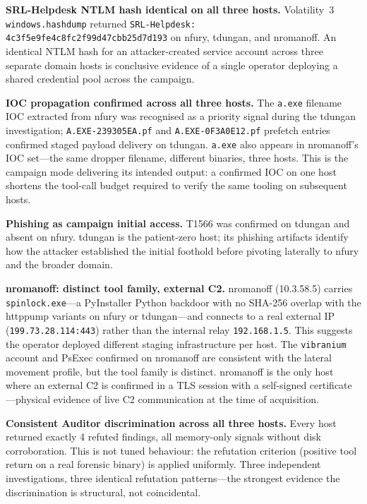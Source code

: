 \documentclass[sigconf, nonacm]{acmart}
\begin{document}
\textbf{SRL-Helpdesk NTLM hash identical on all three hosts.}
Volatility~3 \texttt{windows.hashdump} returned
\texttt{SRL-Helpdesk: 4c3f5e9fe4c8fc2f99d47cbb25d7d193}
on nfury, tdungan, and nromanoff. An identical NTLM hash for an
attacker-created service account across three separate domain hosts
is conclusive evidence of a single operator deploying a shared
credential pool across the campaign.

\textbf{IOC propagation confirmed across all three hosts.}
The \texttt{a.exe} filename IOC extracted from nfury was recognised
as a priority signal during the tdungan investigation;
\texttt{A.EXE-239305EA.pf} and \texttt{A.EXE-0F3A0E12.pf} prefetch
entries confirmed staged payload delivery on tdungan.
\texttt{a.exe} also appears in nromanoff's IOC set---the same dropper
filename, different binaries, three hosts. This is the campaign mode
delivering its intended output: a confirmed IOC on one host shortens
the tool-call budget required to verify the same tooling on subsequent
hosts.

\textbf{Phishing as campaign initial access.} T1566 was confirmed
on tdungan and absent on nfury. tdungan is the patient-zero host;
its phishing artifacts identify how the attacker established the
initial foothold before pivoting laterally to nfury and the broader
domain.

\textbf{nromanoff: distinct tool family, external C2.}
nromanoff (10.3.58.5) carries \texttt{spinlock.exe}---a PyInstaller
Python backdoor with no SHA-256 overlap with the httppump variants on
nfury or tdungan---and connects to a real external IP
(\texttt{199.73.28.114:443}) rather than the internal relay
\texttt{192.168.1.5}. This suggests the operator deployed different
staging infrastructure per host. The \texttt{vibranium} account and
PsExec confirmed on nromanoff are consistent with the lateral
movement profile, but the tool family is distinct. nromanoff is
the only host where an external C2 is confirmed in a TLS session with
a self-signed certificate---physical evidence of live C2 communication
at the time of acquisition.

\textbf{Consistent Auditor discrimination across all three hosts.}
Every host returned exactly 4 refuted findings, all memory-only signals
without disk corroboration. This is not tuned behaviour: the refutation
criterion (positive tool return on a real forensic binary) is applied
uniformly. Three independent investigations, three identical refutation
patterns---the strongest evidence the discrimination is structural,
not coincidental.
\end{document}
